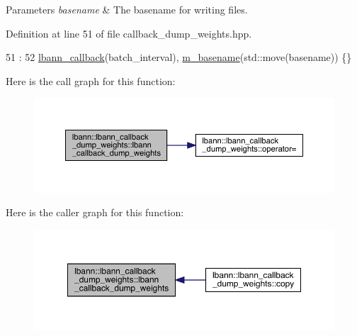 \begin{DoxyParams}{Parameters}
{\em basename} & The basename for writing files. \\
\hline
\end{DoxyParams}


Definition at line 51 of file callback\+\_\+dump\+\_\+weights.\+hpp.


\begin{DoxyCode}
51                                                                           :
52     \hyperlink{classlbann_1_1lbann__callback_a679057298a41ddd47f08c157f756c584}{lbann\_callback}(batch\_interval), \hyperlink{classlbann_1_1lbann__callback__dump__weights_a6c73416bd2edd414e7c4094a19ae2d79}{m\_basename}(std::move(basename)) \{\}
\end{DoxyCode}
Here is the call graph for this function\+:\nopagebreak
\begin{figure}[H]
\begin{center}
\leavevmode
\includegraphics[width=350pt]{classlbann_1_1lbann__callback__dump__weights_a6ad86c6dec233324f013e9d83e574267_cgraph}
\end{center}
\end{figure}
Here is the caller graph for this function\+:\nopagebreak
\begin{figure}[H]
\begin{center}
\leavevmode
\includegraphics[width=350pt]{classlbann_1_1lbann__callback__dump__weights_a6ad86c6dec233324f013e9d83e574267_icgraph}
\end{center}
\end{figure}
\mbox{\label{classlbann_1_1lbann__callback__dump__weights_aeae4724a0e8f9129d76d6822205d854f}} 
